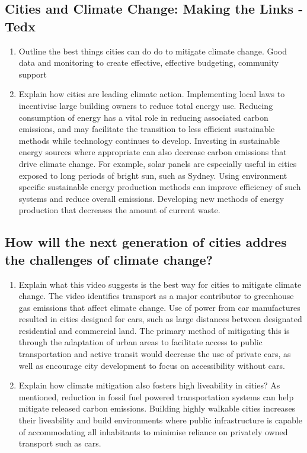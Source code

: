 	\subsection{Cities and Climate Change: Making the Links - Tedx}
		\begin{enumerate}
				\item Outline the best things cities can do do to mitigate climate change.
					\subitem Good data and monitoring to create effective, effective budgeting, community support
				\item Explain how cities are leading climate action.
					\subitem Implementing local laws to incentivise large building owners to reduce total energy use. Reducing consumption of energy has a vital role in reducing associated carbon emissions, and may facilitate the transition to less efficient sustainable methods while technology continues to develop. Investing in sustainable energy sources where appropriate can also decrease carbon emissions that drive climate change. For example, solar panels are especially useful in cities exposed to long periods of bright sun, such as Sydney. Using environment specific sustainable energy production methods can improve efficiency of such systems and reduce overall emissions. Developing new methods of energy production that decreases the amount of current waste.
		\end{enumerate}
	\subsection{How will the next generation of cities addres the challenges of climate change?}
		\begin{enumerate}
			\item Explain what this video suggests is the best way for cities to mitigate climate change.
				\subitem The video identifies transport as a major contributor to greenhouse gas emissions that affect climate change. Use of power from car manufactures resulted in cities designed for cars, such as large distances between designated residential and commercial land. The primary method of mitigating this is through the adaptation of urban areas to facilitate access to public transportation and active transit would decrease the use of private cars, as well as encourage city development to focus on accessibility without cars.
			\item Explain how climate mitigation also fosters high liveability in cities?
				\subitem As mentioned, reduction in fossil fuel powered transportation systems can help mitigate released carbon emissions. Building highly walkable cities increases their liveability and build environments where public infrastructure is capable of accommodating all inhabitants to minimise reliance on privately owned transport such as cars.
		\end{enumerate}
